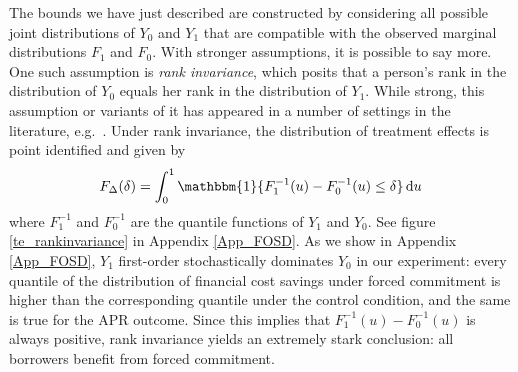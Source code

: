 \documentclass[oneside,11pt]{article}
\begin{document}
The bounds we have just described are constructed by considering all possible joint distributions of $Y_0$ and $Y_1$ that are compatible with the observed marginal distributions $F_1$ and $F_0$. 
With stronger assumptions, it is possible to say more.
One such assumption is \emph{rank invariance}, which posits that a person's rank in the distribution of $Y_0$ equals her rank in the distribution of $Y_1$.
While strong, this assumption or variants of it has appeared in a number of settings in the literature, e.g.\ \cite{chernozhukov2005iv}. 
Under rank invariance, the distribution of treatment effects is point identified and given by 
\[
F_\Delta(\delta) = \int_0^1 \mathbbm{1}\{ F_1^{-1}(u) - F_0^{-1}(u)\leq \delta\}\,\mathrm{d}u 
\]
where $F_1^{-1}$ and $F_0^{-1}$ are the quantile functions of $Y_1$ and $Y_0$. See figure \ref{te_rankinvariance} in Appendix \ref{App_FOSD}.
As we show in Appendix \ref{App_FOSD}, $Y_1$ first-order stochastically dominates $Y_0$ in our experiment: every quantile of the distribution of financial cost savings under forced commitment is higher than the corresponding quantile under the control condition, and the same is true for the APR outcome.
Since this implies that $F^{-1}_1(u) - F^{-1}_0(u)$ is always positive, rank invariance yields an extremely stark conclusion: all borrowers benefit from forced commitment. 
\end{document}

